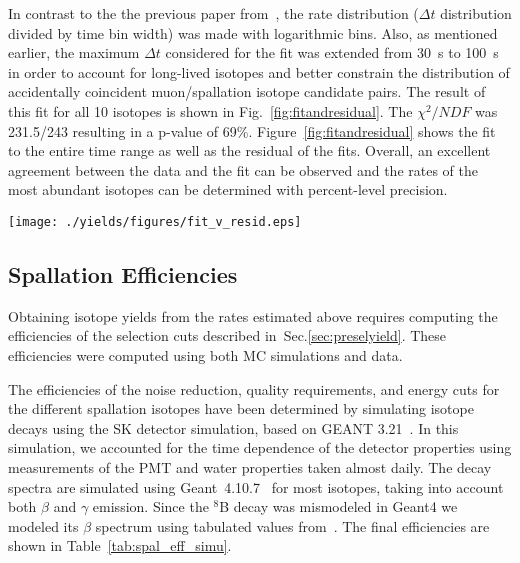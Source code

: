 In contrast to the the previous paper from~\cite{SKspall_zhang}, the rate distribution ($\Delta t$ distribution divided by time bin width) was made with logarithmic bins. Also, as mentioned earlier, the maximum $\Delta t$ considered for the fit was extended from 30~s to 100~s in order to account for long-lived isotopes and better constrain the distribution of accidentally coincident muon/spallation isotope candidate pairs. The result of this fit for all 10 isotopes is shown in Fig.~\ref{fig:fitandresidual}. The $\chi^2/NDF$ was 231.5/243 resulting in a p-value of 69\%. Figure~\ref{fig:fitandresidual} shows the fit to the entire time range as well as the residual of the fits. Overall, an excellent agreement between the data and the fit can be observed and the rates of the most abundant isotopes can be determined with percent-level precision.

\begin{figure*}
    \centering
    \texttt{[image: ./yields/figures/fit\_v\_resid.eps]}
    \caption{Left: Full $\Delta t$ distribution from 50~$\mu$s to 100~s. The solid red line corresponds to the entire fit, and the colored lines correspond to the individual isotope fits and background. Right: Fit residuals shown using unscaled data minus the fit value at the bin center multiplied by the with of the corresponding time bin.}
    \label{fig:fitandresidual}
\end{figure*}

\subsection{Spallation Efficiencies}
\label{sec:productionrates}
Obtaining isotope yields from the rates estimated above requires computing the efficiencies of the selection cuts described in~Sec.\ref{sec:preselyield}. These efficiencies were computed using both MC simulations and data. 

The efficiencies of the noise reduction, quality requirements, and energy cuts for the different spallation isotopes have been determined by simulating isotope decays using the SK detector simulation, based on GEANT 3.21~\cite{geant3}. In this simulation, we accounted for the time dependence of the detector properties using measurements of the PMT and water properties taken almost daily. The decay spectra are simulated using Geant~4.10.7~\cite{GEANT41,GEANT42} for most isotopes, taking into account both $\beta$ and $\gamma$ emission. Since the $^8$B decay was mismodeled in Geant4 we modeled its $\beta$ spectrum using tabulated values from~\cite{Winter:2004kf}. The final efficiencies are shown in Table~\ref{tab:spal_eff_simu}.

